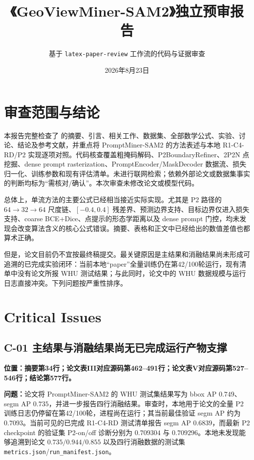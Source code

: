 \documentclass[UTF8,a4paper,11pt]{ctexart}
\title{《GeoViewMiner-SAM2》独立预审报告}
\author{基于 \texttt{latex-paper-review} 工作流的代码与证据审查}
\date{2026年8月23日}
\newcommand{\loc}[1]{\textbf{位置：#1}}
\newcommand{\prob}{\textbf{问题：}}
\begin{document}
\maketitle

\section*{审查范围与结论}

本报告完整检查了  的摘要、引言、相关工作、数据集、全部数学公式、实验、讨论、结论及参考文献，并重点将 PromptMiner-SAM2 的方法表述与本地 R1-C4-RD/P2 实现逐项对照。代码核查覆盖粗掩码解码、P2BoundaryRefiner、2P2N 点挖掘、dense prompt rasterization、PromptEncoder/MaskDecoder 数据流、损失归一化、训练参数和现有评估清单。未进行联网检索；依赖外部论文或数据集事实的判断均标为“需核对/确认”。本次审查未修改论文或模型代码。

总体上，单流方法的主要公式已经相当接近实际实现。尤其是 P2 路径的 $64\to32\to64$ 尺度链、$[-0.4,0.4]$ 残差界、预测边界支持、目标边界仅进入损失支持、coarse BCE+Dice、点提示的形态学距离以及 dense prompt 门控，均未发现会改变算法含义的核心公式错误。摘要、表格和正文中已经给出的数值差值也都算术正确。

但是，论文目前仍不宜按最终稿提交。最关键原因是主结果和消融结果尚未形成可追溯的已完成实验闭环：当前本地“paper”全量训练仍在第42/100轮运行，现有清单中没有论文所报 WHU 测试结果；与此同时，论文中的 WHU 数据规模与运行日志直接冲突。下列问题按严重性排序。

\section*{Critical Issues}

\subsection*{C-01 主结果与消融结果尚无已完成运行产物支撑}
\loc{摘要第34行；论文表III对应源码第462--491行；论文表V对应源码第527--546行；结论第577行。}

\prob 论文将 PromptMiner-SAM2 的 WHU 测试集结果写为 bbox AP $0.749$、segm AP $0.735$，并进一步报告四行消融结果。审查时，本地用于论文的全量 P2 训练日志仍停留在第42/100轮，进程尚在运行；其当前最佳验证 segm AP 约为 $0.7093$。当前可见的已完成 R1-C4-RD 测试清单报告 segm AP $0.6839$，而最新 P2 checkpoint 的验证集 P2-on/off 诊断分别为 $0.709304$ 与 $0.709296$。本地未发现能够追溯到论文 $0.735/0.944/0.855$ 以及四行消融数据的测试集 \texttt{metrics.json}/\texttt{run\_manifest.json}。
\end{document}

